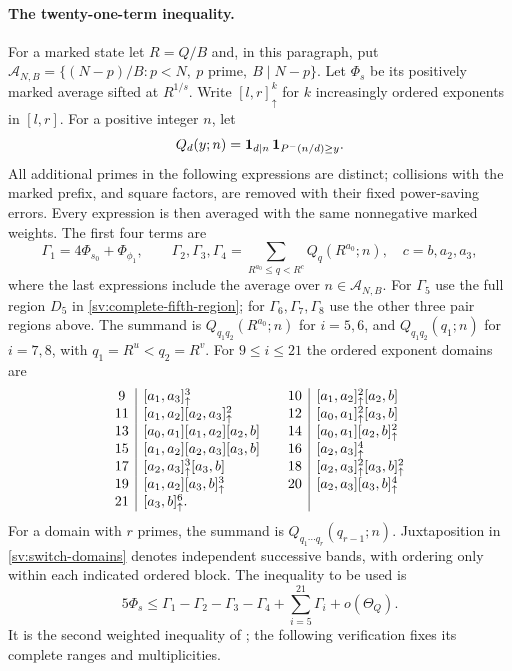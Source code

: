 \paragraph{The twenty-one-term inequality.}
For a marked state let $R=Q/B$ and, in this paragraph, put
$\mathcal A_{N,B}=\{(N-p)/B:p<N,\ p\text{ prime},\ B\mid N-p\}$.
Let $\Phi_s$ be its positively marked average sifted at $R^{1/s}$.
Write $[l,r]^k_\uparrow$ for $k$ increasingly ordered exponents in
$[l,r]$.  For a positive integer $n$, let
\[
 Q_d(y;n)=\mathbf 1_{d\mid n}\,
                  \mathbf 1_{P^-(n/d)\ge y}.
\]
All additional primes in the following expressions are distinct;
collisions with the marked prefix, and square factors, are removed
with their fixed power-saving errors.  Every expression is then
averaged with the same nonnegative marked weights.
The first four terms are
\[
 \Gamma_1=4\Phi_{s_0}+\Phi_{\phi_1},\qquad
 \Gamma_2,\Gamma_3,\Gamma_4
   =\sum_{R^{a_0}\le q<R^c}Q_q(R^{a_0};n),
 \quad c=b,a_2,a_3,
\]
where the last expressions include the average over $n\in\mathcal A_{N,B}$.
For $\Gamma_5$ use the full region $D_5$ in
\eqref{sv:complete-fifth-region}; for $\Gamma_6,\Gamma_7,\Gamma_8$
use the other three pair regions above. The summand is
$Q_{q_1q_2}(R^{a_0};n)$ for $i=5,6$, and
$Q_{q_1q_2}(q_1;n)$ for $i=7,8$, with
$q_1=R^u<q_2=R^v$.
For $9\le i\le21$ the ordered exponent domains are
\begin{equation}\label{sv:switch-domains}
\begin{array}{c|l@{\qquad}c|l}
9 &[a_1,a_3]^3_\uparrow
 &10 &[a_1,a_2]^2_\uparrow[a_2,b]\\
11 &[a_1,a_2][a_2,a_3]^2_\uparrow
 &12 &[a_0,a_1]^2_\uparrow[a_3,b]\\
13 &[a_0,a_1][a_1,a_2][a_2,b]
 &14 &[a_0,a_1][a_2,b]^2_\uparrow\\
15 &[a_1,a_2][a_2,a_3][a_3,b]
 &16 &[a_2,a_3]^4_\uparrow\\
17 &[a_2,a_3]^3_\uparrow[a_3,b]
 &18 &[a_2,a_3]^2_\uparrow[a_3,b]^2_\uparrow\\
19 &[a_1,a_2][a_3,b]^3_\uparrow
 &20 &[a_2,a_3][a_3,b]^4_\uparrow\\
21 &[a_3,b]^6_\uparrow.&&
\end{array}
\end{equation}
For a domain with $r$ primes, the summand is
$Q_{q_1\cdots q_r}(q_{r-1};n)$.  Juxtaposition in
\eqref{sv:switch-domains} denotes independent successive bands,
with ordering only within each indicated ordered block.
The inequality to be used is
\begin{equation}\label{sv:twenty-one-weight}
 5\Phi_s\le\Gamma_1-\Gamma_2-\Gamma_3-\Gamma_4
                       +\sum_{i=5}^{21}\Gamma_i+o(\Theta_Q).
\end{equation}
It is the second weighted inequality of \cite[Lemma~4.2]{Wu2004};
the following verification fixes its complete ranges and multiplicities.

